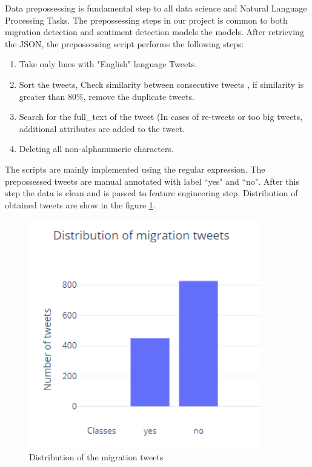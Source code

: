 Data prepossessing is fundamental step to all data science and
Natural Language Processing Tasks. The prepossessing steps in
our project is common to both migration detection and sentiment detection models the models. After retrieving the JSON, the prepossessing script performs the following steps:
\begin{enumerate}
    \item Take only lines with "English" language Tweets.
    \item Sort the tweets, Check similarity between consecutive tweets , if similarity is greater than 80\%, remove the duplicate tweets.
    \item Search for the full\_text of the tweet (In cases of re-tweets or too big tweets, additional attributes are added to the tweet.
    \item Deleting all non-alphanumeric characters.
\end{enumerate}
The scripts are mainly implemented using the regular expression. The prepossessed tweets are manual annotated with label ``yes" and ``no". After this step the data is clean and is passed to feature engineering step. Distribution of obtained tweets are show in the figure \ref{fig:graphDistmigration}.

\begin{figure}
	\centering
	\includegraphics[width=10cm\linewidth,height=10cm]{thesis_template/images/distofmigration_tweetsundefined.png}
	\caption{Distribution of the migration tweets}
	\label{fig:graphDistmigration}
\end{figure}


